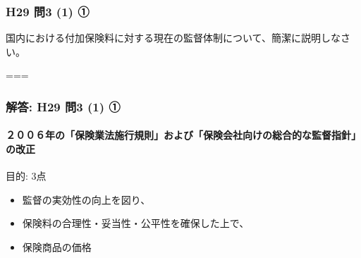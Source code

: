 \documentclass[
]{article}
\providecommand{\tightlist}{%
  \setlength{\itemsep}{0pt}\setlength{\parskip}{0pt}}
\begin{document}
\hypertarget{h29-ux554f3-1-ux2460}{%
\subsubsection{H29 問3 (1) ①}\label{h29-ux554f3-1-ux2460}}

国内における付加保険料に対する現在の監督体制について、簡潔に説明しなさい。

===

\hypertarget{ux89e3ux7b54-h29-ux554f3-1-ux2460}{%
\subsubsection{解答: H29 問3 (1)
①}\label{ux89e3ux7b54-h29-ux554f3-1-ux2460}}

\hypertarget{ux5e74ux306eux4fddux967aux696dux6cd5ux65bdux884cux898fux5247ux304aux3088ux3073ux4fddux967aux4f1aux793eux5411ux3051ux306eux7dcfux5408ux7684ux306aux76e3ux7763ux6307ux91ddux306eux6539ux6b63}{%
\paragraph{２００６年の「保険業法施行規則」および「保険会社向けの総合的な監督指針」の改正}\label{ux5e74ux306eux4fddux967aux696dux6cd5ux65bdux884cux898fux5247ux304aux3088ux3073ux4fddux967aux4f1aux793eux5411ux3051ux306eux7dcfux5408ux7684ux306aux76e3ux7763ux6307ux91ddux306eux6539ux6b63}}

目的: 3点

\begin{itemize}
\tightlist
\item
  監督の実効性の向上を図り、
\item
  保険料の合理性・妥当性・公平性を確保した上で、
\item
  保険商品の価格
\end{itemize}
\end{document}
